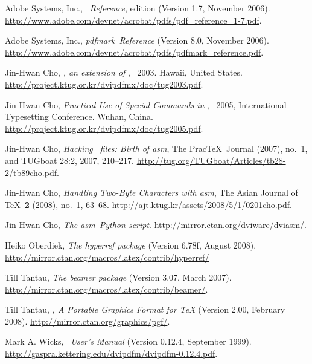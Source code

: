 \documentclass[final]{ltugboat}
\def\DVIasm{\acro{DVI}asm}
\def\DPM{\acro{DVI\-PDFM}}
\let\DPX\DVIPDFMx
\def\pdfmark{pdfmark}
\def\ctanloc#1{\url{http://mirror.ctan.org/#1}}
\begin{document}
\SetBibJustification\raggedright
\begin{thebibliography}{99}

 Adobe Systems, Inc., \emph{\PDF\ Reference},  edition (Version 1.7, November 2006).
  \url{http://www.adobe.com/devnet/acrobat/pdfs/pdf_reference_1-7.pdf}.

 Adobe Systems, Inc., \emph{\pdfmark\ Reference}
(Version 8.0, November 2006).
  \url{http://www.adobe.com/devnet/acrobat/pdfs/pdfmark_reference.pdf}.

Jin-Hwan Cho, \emph{\DPX, an extension of \DPM},
  \tug\ 2003. Hawaii, United States.
  \url{http://project.ktug.or.kr/dvipdfmx/doc/tug2003.pdf}.

Jin-Hwan Cho, \emph{Practical Use of Special Commands in \DPX},
  \tug\ 2005, International Typesetting Conference. Wuhan, China.
  \url{http://project.ktug.or.kr/dvipdfmx/doc/tug2005.pdf}.

Jin-Hwan Cho, \emph{Hacking \DVI\ files: Birth of \DVIasm}, The Prac\TeX\ Journal (2007), no.~1, and TUGboat 28:2, 2007, 210--217.
  \url{http://tug.org/TUGboat/Articles/tb28-2/tb89cho.pdf}.

Jin-Hwan Cho, \emph{Handling Two-Byte Characters with \DVIasm}, The Asian Journal of \TeX\ \textbf{2} (2008), no.~1, 63--68.
  \url{http://ajt.ktug.kr/assets/2008/5/1/0201cho.pdf}.

Jin-Hwan Cho, \emph{The \DVIasm\ Python script}.
  \ctanloc{dviware/dviasm/}.

Heiko Oberdiek, \emph{The hyperref package} (Version 6.78f, August 2008).
  \ctanloc{macros/latex/contrib/hyperref/}

Till Tantau, \emph{The beamer package} (Version 3.07, March 2007).
  \ctanloc{macros/latex/contrib/beamer/}.

\newpage
{}
Till Tantau, \emph{\PGF, A Portable Graphics Format for \TeX} (Version 2.00, February 2008).
  \ctanloc{graphics/pgf/}.

 Mark A. Wicks, \emph{\DPM\ User's Manual}
(Version 0.12.4, September 1999).
  \url{http://gaspra.kettering.edu/dvipdfm/dvipdfm-0.12.4.pdf}.

\end{thebibliography}
\medskip
\makesignature
\end{document}
